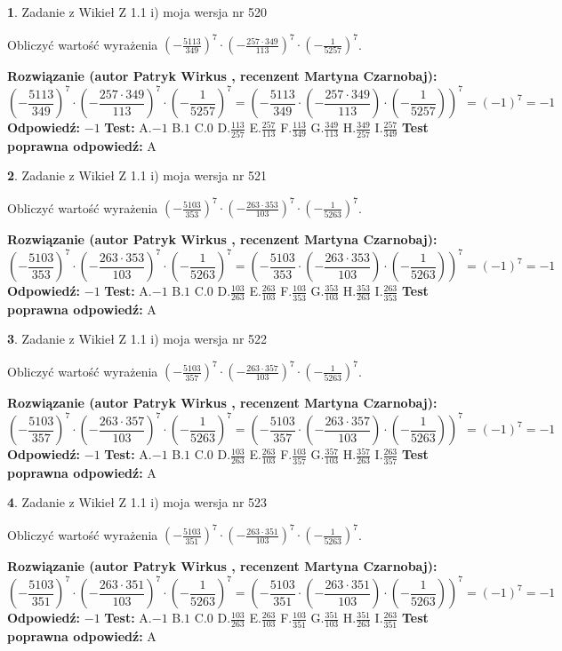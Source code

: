 \documentclass[12pt, a4paper]{article}
\theoremstyle{definition} %
\newtheorem{zad}{}
\newcommand{\zadStart}[1]{\begin{zad}#1\newline}
\newcommand{\zadStop}{\end{zad}}
\newcommand{\rozwStart}[2]{\noindent \textbf{Rozwiązanie (autor #1 , recenzent #2): }\newline}
\newcommand{\rozwStop}{\newline}
\newcommand{\odpStart}{\noindent \textbf{Odpowiedź:}\newline}
\newcommand{\odpStop}{\newline}
\newcommand{\testStart}{\noindent \textbf{Test:}\newline}
\newcommand{\testStop}{\newline}
\newcommand{\kluczStart}{\noindent \textbf{Test poprawna odpowiedź:}\newline}
\newcommand{\kluczStop}{\newline}
\begin{document}
\zadStart{Zadanie z Wikieł Z 1.1 i) moja wersja nr 520}

Obliczyć wartość wyrażenia $(-\frac{5113}{349})^{7} \cdot (-\frac{257 \cdot 349}{113})^{7} \cdot (-\frac{1}{5257})^{7}$.
\zadStop
\rozwStart{Patryk Wirkus}{Martyna Czarnobaj}
$$(-\frac{5113}{349})^{7} \cdot (-\frac{257 \cdot 349}{113})^{7} \cdot (-\frac{1}{5257})^{7} = (-\frac{5113}{349} \cdot (-\frac{257 \cdot 349}{113}) \cdot (-\frac{1}{5257}))^{7} = (-1)^{7} = -1$$
\rozwStop
\odpStart
$-1$
\odpStop
\testStart
A.$-1$ B.$1$ C.$0$ D.$\frac{113}{257}$ E.$\frac{257}{113}$
F.$\frac{113}{349}$ G.$\frac{349}{113}$
H.$\frac{349}{257}$
I.$\frac{257}{349}$
\testStop
\kluczStart
A
\kluczStop



\zadStart{Zadanie z Wikieł Z 1.1 i) moja wersja nr 521}

Obliczyć wartość wyrażenia $(-\frac{5103}{353})^{7} \cdot (-\frac{263 \cdot 353}{103})^{7} \cdot (-\frac{1}{5263})^{7}$.
\zadStop
\rozwStart{Patryk Wirkus}{Martyna Czarnobaj}
$$(-\frac{5103}{353})^{7} \cdot (-\frac{263 \cdot 353}{103})^{7} \cdot (-\frac{1}{5263})^{7} = (-\frac{5103}{353} \cdot (-\frac{263 \cdot 353}{103}) \cdot (-\frac{1}{5263}))^{7} = (-1)^{7} = -1$$
\rozwStop
\odpStart
$-1$
\odpStop
\testStart
A.$-1$ B.$1$ C.$0$ D.$\frac{103}{263}$ E.$\frac{263}{103}$
F.$\frac{103}{353}$ G.$\frac{353}{103}$
H.$\frac{353}{263}$
I.$\frac{263}{353}$
\testStop
\kluczStart
A
\kluczStop



\zadStart{Zadanie z Wikieł Z 1.1 i) moja wersja nr 522}

Obliczyć wartość wyrażenia $(-\frac{5103}{357})^{7} \cdot (-\frac{263 \cdot 357}{103})^{7} \cdot (-\frac{1}{5263})^{7}$.
\zadStop
\rozwStart{Patryk Wirkus}{Martyna Czarnobaj}
$$(-\frac{5103}{357})^{7} \cdot (-\frac{263 \cdot 357}{103})^{7} \cdot (-\frac{1}{5263})^{7} = (-\frac{5103}{357} \cdot (-\frac{263 \cdot 357}{103}) \cdot (-\frac{1}{5263}))^{7} = (-1)^{7} = -1$$
\rozwStop
\odpStart
$-1$
\odpStop
\testStart
A.$-1$ B.$1$ C.$0$ D.$\frac{103}{263}$ E.$\frac{263}{103}$
F.$\frac{103}{357}$ G.$\frac{357}{103}$
H.$\frac{357}{263}$
I.$\frac{263}{357}$
\testStop
\kluczStart
A
\kluczStop



\zadStart{Zadanie z Wikieł Z 1.1 i) moja wersja nr 523}

Obliczyć wartość wyrażenia $(-\frac{5103}{351})^{7} \cdot (-\frac{263 \cdot 351}{103})^{7} \cdot (-\frac{1}{5263})^{7}$.
\zadStop
\rozwStart{Patryk Wirkus}{Martyna Czarnobaj}
$$(-\frac{5103}{351})^{7} \cdot (-\frac{263 \cdot 351}{103})^{7} \cdot (-\frac{1}{5263})^{7} = (-\frac{5103}{351} \cdot (-\frac{263 \cdot 351}{103}) \cdot (-\frac{1}{5263}))^{7} = (-1)^{7} = -1$$
\rozwStop
\odpStart
$-1$
\odpStop
\testStart
A.$-1$ B.$1$ C.$0$ D.$\frac{103}{263}$ E.$\frac{263}{103}$
F.$\frac{103}{351}$ G.$\frac{351}{103}$
H.$\frac{351}{263}$
I.$\frac{263}{351}$
\testStop
\kluczStart
A
\kluczStop
\end{document}
